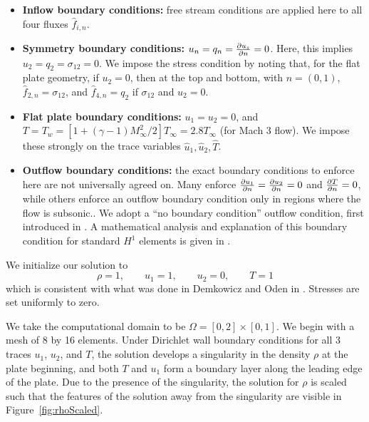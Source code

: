 \begin{itemize}
\item \textbf{Inflow boundary conditions:} free stream conditions are applied here to all four fluxes $\widehat{f}_{i,n}$.
\item \textbf{Symmetry boundary conditions:} $u_n = q_n = \pd{u_s}{n} = 0$. Here, this implies $u_2 = q_2 = \sigma_{12} = 0$. We impose the stress condition by noting that, for the flat plate geometry, if $u_2 = 0$, then at the top and bottom, with $n = (0,1)$, $\widehat{f}_{2,n} = \sigma_{12}$, and $\widehat{f}_{4,n} = q_2$ if $\sigma_{12}$ and $u_2 = 0$. 
\item \textbf{Flat plate boundary conditions:} $u_1 = u_2 = 0$, and $T = T_w = \left[1+(\gamma-1)M_\infty^2/2\right] T_\infty = 2.8T_\infty$ (for Mach 3 flow). We impose these strongly on the trace variables $\widehat{u}_1, \widehat{u}_2, \widehat{T}$. 
\item \textbf{Outflow boundary conditions:} the exact boundary conditions to enforce here are not universally agreed on.  Many enforce $\pd{u_1}{n}=\pd{u_2}{n}=0$ and $\pd{T}{n} = 0$, while others enforce an outflow boundary condition only in regions where the flow is subsonic.\cite{Demkowicz:1990:NFE:112271.112276}.  We adopt a ``no boundary condition'' outflow condition, first introduced in \cite{FLD:FLD1650140506}. A mathematical analysis and explanation of this boundary condition for standard $H^1$ elements is given in \cite{FLD:FLD505}. 


\end{itemize}

We initialize our solution to
\[
\rho = 1,\qquad u_1= 1,\qquad u_2 = 0, \qquad T = 1
\]
which is consistent with what was done in Demkowicz and Oden in \cite{Demkowicz:1990:NFE:112271.112276}. Stresses are set uniformly to zero. 

We take the computational domain to be $\Omega = [0,2]\times[0,1]$. We begin with a mesh of 8 by 16 elements. Under Dirichlet wall boundary conditions for all 3 traces $u_1$, $u_2$, and $T$, the solution develops a singularity in the density $\rho$ at the plate beginning, and both $T$ and $u_1$ form a boundary layer along the leading edge of the plate. Due to the presence of the singularity, the solution for $\rho$ is scaled such that the features of the solution away from the singularity are visible in Figure~\ref{fig:rhoScaled}.

